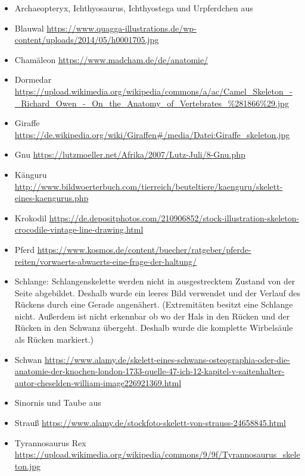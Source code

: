  \begin{itemize}
  \item Archaeopteryx, Ichthyosaurus, Ichthyostega und Urpferdchen aus \cite{Zoologie24Wehner}
  \item Blauwal \url{https://www.quagga-illustrations.de/wp-content/uploads/2014/05/h0001705.jpg}
  \item Chamäleon \url{https://www.madcham.de/de/anatomie/}
  \item Dormedar \url{https://upload.wikimedia.org/wikipedia/commons/a/ac/Camel_Skeleton_-_Richard_Owen_-_On_the_Anatomy_of_Vertebrates_\%281866\%29.jpg}
  \item Giraffe\\ \url{https://de.wikipedia.org/wiki/Giraffen#/media/Datei:Giraffe_skeleton.jpg}
  \item Gnu \url{https://lutzmoeller.net/Afrika/2007/Lutz-Juli/8-Gnu.php}
  \item Känguru \url{http://www.bildwoerterbuch.com/tierreich/beuteltiere/kaenguru/skelett-eines-kaengurus.php}
  \item Krokodil \url{https://de.depositphotos.com/210906852/stock-illustration-skeleton-crocodile-vintage-line-drawing.html}
  \item Pferd \url{https://www.kosmos.de/content/buecher/ratgeber/pferde-reiten/vorwaerts-abwaerts-eine-frage-der-haltung/}
  \item Schlange: Schlangenskelette werden nicht in ausgestrecktem Zustand von der Seite abgebildet. Deshalb wurde ein leeres Bild verwendet und der Verlauf des Rückens durch eine Gerade angenähert. (Extremitäten besitzt eine Schlange nicht. Außerdem ist nicht erkennbar ob \bzw wo der Hals in den Rücken und der Rücken in den Schwanz übergeht. Deshalb wurde die komplette Wirbelsäule als Rücken markiert.)
  \item Schwan \url{https://www.alamy.de/skelett-eines-schwans-osteographia-oder-die-anatomie-der-knochen-london-1733-quelle-47-ich-12-kapitel-v-saitenhalter-autor-cheselden-william-image226921369.html}
  \item Sinornis und Taube aus \cite{Vergleichende_Anatomie}
  \item Strauß \url{https://www.alamy.de/stockfoto-skelett-von-strauss-24658845.html}
  \item Tyrannosaurus Rex \url{https://upload.wikimedia.org/wikipedia/commons/9/9f/Tyrannosaurus_skeleton.jpg}
 \end{itemize}
 
